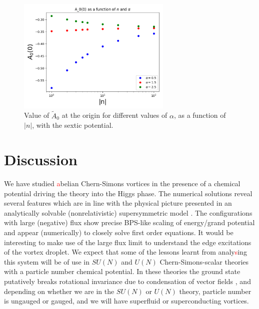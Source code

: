 \begin{figure}[H]
\begin{center}
    \includegraphics[width=2.9in]{Chapter_2_Folder_1912.11321/figures/sixth_order_A0.pdf}     \caption[This figure shows value of $\tilde A_0$ at the origin for different values of $\alpha$, as a function of $|n|$,  
 with the sextic potential.]{{ \small Value of $\tilde A_0$ at the origin for different values of $\alpha$, as a function of $|n|$,  
 with the sextic potential.}} \label{A0sextic}
    \end{center}
\end{figure}
\section{Discussion}
We have studied \textcolor{red}{a}belian Chern-Simons vortices in the presence of a chemical potential driving the theory into the Higgs phase. The numerical solutions reveal several features which are in line with the physical picture presented in an analytically solvable (nonrelativistic) supersymmetric model \cite{Tong:2015xaa, Tong:2003vy}.  The configurations with large (negative) flux show precise BPS-like scaling of energy/grand potential and appear (numerically) to closely solve first order equations.
It would be interesting to make use of the large flux limit to understand the edge excitations of the vortex droplet. We expect that some of the lessons learnt from analy\textcolor{red}{s}ing this system will be of use in $SU(N)$ and $U(N)$ Chern-Simons-scalar theories with a particle number chemical potential. In these theories the ground state putatively breaks rotational invariance due to condensation of vector fields \cite{Kumar:2018nkf}, and depending on whether we are in the $SU(N)$ or $U(N)$ theory, particle number is ungauged or gauged,  and we will have superfluid or superconducting vortices. 



